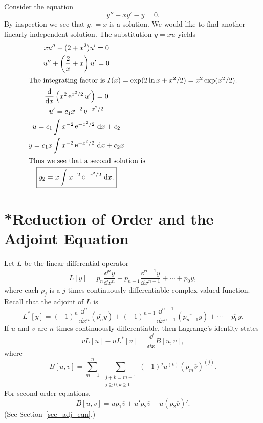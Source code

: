 \begin{Example}
  Consider the equation
  \[ 
  y'' + x y' - y = 0.
  \]
  By inspection we see that $y_1 = x$ is a solution.  
  We would like to find another linearly
  independent solution.  The substitution $y = x u$ yields
  \begin{gather*}
    x u'' + (2 + x^2)u' = 0 \\
    u'' + \left(\frac{2}{x} + x \right) u' = 0 \\
    \intertext{The integrating factor is $I(x) = \exp(2\ln x + x^2/2) 
      = x^2 \exp(x^2/2)$.}
    \frac{\mathrm{d}}{\mathrm{d} x} \left(x^2 \mathop{\mathrm{e}}\nolimits^{x^2/2} u' \right) = 0 \\
    u' = c_1 x^{-2} \mathop{\mathrm{e}}\nolimits^{-x^2/2} \\
    u = c_1 \int x^{-2} \mathop{\mathrm{e}}\nolimits^{-x^2/2}\,\mathrm{d} x + c_2 \\
    y = c_1 x \int x^{-2} \mathop{\mathrm{e}}\nolimits^{-x^2/2}\,\mathrm{d} x + c_2x \\
    \intertext{Thus we see that a second solution is}
    \boxed{y_2 = x \int x^{-2} \mathop{\mathrm{e}}\nolimits^{-x^2/2}\,\mathrm{d} x.}
  \end{gather*}
\end{Example}













\section{*Reduction of Order and the Adjoint Equation}




Let $L$ be the linear differential operator
\[ 
L[y] = p_n \frac{\dd^n y}{\dd x^n} + p_{n-1} \frac{\dd^{n-1}y}{\dd x^{n-1}} + \cdots + p_0 y,
\]
where each $p_j$ is a $j$ times continuously differentiable complex valued 
function.
Recall that the adjoint of $L$ is
\[ 
L^*[y] = (-1)^n \frac{\dd^n}{\dd x^n} (\overline{p_n} y) 
+ (-1)^{n-1} \frac{\dd^{n-1}}{\dd x^{n-1}} (\overline{p_{n-1}} y) + \cdots + \overline{p_0} y. 
\]
If $u$ and $v$ are $n$ times continuously differentiable, then 
Lagrange's identity states
\[ 
\overline{v} L[u] - u \overline{L^*[v]} = \frac{\dd}{\dd x} B[u, v], 
\]
where
\[ 
B[u,v] = \sum_{m=1}^n \ \sum_{\substack{ j+k=m-1 \\ j\geq 0, k \geq 0 }}
(-1)^j u^{(k)} (p_m \overline{v})^{(j)}.
\]
For second order equations,
\[ 
B[u,v] = u p_1 \overline{v} + u' p_2 \overline{v} - u (p_2 \overline{v})' .
\]
(See Section~\ref{sec_adj_eqn}.)

